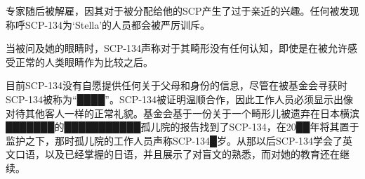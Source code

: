 专家随后被解雇，因其对于被分配给他的SCP产生了过于亲近的兴趣。任何被发现称呼SCP-134为‘Stella’的人员都会被严厉训斥。

当被问及她的眼睛时，SCP-134声称对于其畸形没有任何认知，即使是在被允许感受正常的人类眼睛作为比较之后。

目前SCP-134没有自愿提供任何关于父母和身份的信息，尽管在被基金会寻获时SCP-134被称为“████”。SCP-134被证明温顺合作，因此工作人员必须显示出像对待其他客人一样的正常礼貌。基金会基于一份关于一个畸形儿被遗弃在日本横滨███████的███████████孤儿院的报告找到了SCP-134，在20██年将其置于监护之下，那时孤儿院的工作人员声称SCP-134█岁。从那以后SCP-134学会了英文口语，以及已经掌握的日语，并且展示了对盲文的熟悉，而对她的教育还在继续。
